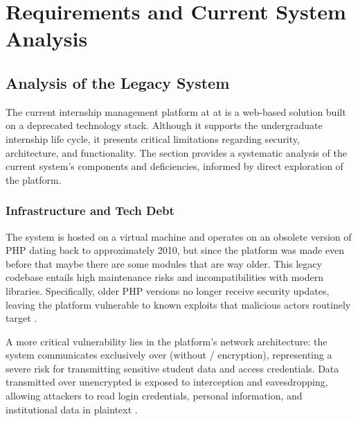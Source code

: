 %

\chapter{Requirements and Current System Analysis}
\label{cha:requirements_and_system_analysis}


\epigraphfontsize{\small\itshape}
\setlength\epigraphwidth{12.5cm}
\setlength\epigraphrule{0pt}

\section{Analysis of the Legacy System}
\label{sec:reqs_analysis_legacy}
\ntindex[Template]{}
    {
        The current internship management platform at  at   is a web-based solution built on a deprecated technology stack. 
        Although it supports the undergraduate internship life cycle, it presents critical limitations regarding security, architecture, and functionality. 
        The section provides a systematic analysis of the current system's components and deficiencies, informed by direct exploration of the platform.
    }

    \subsection{Infrastructure and Tech Debt}
        {
            The system is hosted on a virtual machine and operates on an obsolete version of PHP dating back to approximately 2010, 
            but since the platform was made even before that maybe there are some modules that are way older. 
            This legacy codebase entails high maintenance risks and incompatibilities with modern libraries. 
            Specifically, older PHP versions no longer receive security updates, leaving the platform vulnerable to known exploits that malicious actors routinely target \cite{fastcomet-legacy-php-vulnerable}.
        }

        {
            A more critical vulnerability lies in the platform's network architecture: 
            the system communicates exclusively over  (without / encryption), 
            representing a severe risk for transmitting sensitive student data and access credentials. 
            Data transmitted over unencrypted  is exposed to interception and eavesdropping, allowing attackers to read login credentials, personal information, and institutional data in plaintext \cite{rfc8446-tls13}.
        }

